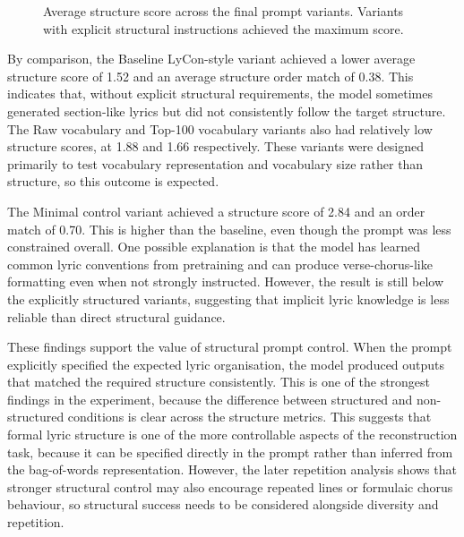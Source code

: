 \begin{figure}[H]
\centering
{}
\caption{Average structure score across the final prompt variants. Variants with explicit structural instructions achieved the maximum score.}
\label{fig:structure_score_by_variant}
\end{figure}

By comparison, the Baseline LyCon-style variant achieved a lower average structure score of 1.52 and an average structure order match of 0.38. This indicates that, without explicit structural requirements, the model sometimes generated section-like lyrics but did not consistently follow the target structure. The Raw vocabulary and Top-100 vocabulary variants also had relatively low structure scores, at 1.88 and 1.66 respectively. These variants were designed primarily to test vocabulary representation and vocabulary size rather than structure, so this outcome is expected.

The Minimal control variant achieved a structure score of 2.84 and an order match of 0.70. This is higher than the baseline, even though the prompt was less constrained overall. One possible explanation is that the model has learned common lyric conventions from pretraining and can produce verse-chorus-like formatting even when not strongly instructed. However, the result is still below the explicitly structured variants, suggesting that implicit lyric knowledge is less reliable than direct structural guidance.

These findings support the value of structural prompt control. When the prompt explicitly specified the expected lyric organisation, the model produced outputs that matched the required structure consistently. This is one of the strongest findings in the experiment, because the difference between structured and non-structured conditions is clear across the structure metrics. This suggests that formal lyric structure is one of the more controllable aspects of the reconstruction task, because it can be specified directly in the prompt rather than inferred from the bag-of-words representation. However, the later repetition analysis shows that stronger structural control may also encourage repeated lines or formulaic chorus behaviour, so structural success needs to be considered alongside diversity and repetition.


